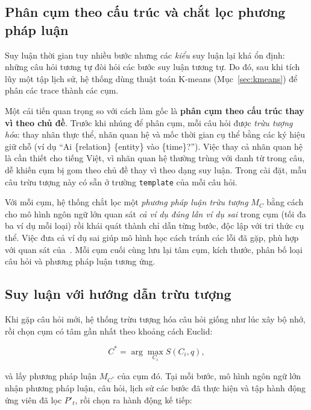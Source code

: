 \subsection{Phân cụm theo cấu trúc và chắt lọc phương pháp luận}
\label{sec:induce}

Suy luận thời gian tuy nhiều bước nhưng các \emph{kiểu} suy luận lại khá ổn định: những câu hỏi
tương tự đòi hỏi các bước suy luận tương tự. Do đó, sau khi tích lũy một tập lịch sử, hệ thống dùng
thuật toán K-means (Mục~\ref{sec:kmeans}) để phân các trace thành các cụm.

Một cải tiến quan trọng so với cách làm gốc là \textbf{phân cụm theo cấu trúc thay vì theo chủ đề}.
Trước khi nhúng để phân cụm, mỗi câu hỏi được \emph{trừu tượng hóa}: thay nhãn thực thể, nhãn quan
hệ và mốc thời gian cụ thể bằng các ký hiệu giữ chỗ (ví dụ ``Ai \{relation\} \{entity\} vào
\{time\}?''). Việc thay cả nhãn quan hệ là cần thiết cho tiếng Việt, vì nhãn quan hệ thường trùng
với danh từ trong câu, dễ khiến cụm bị gom theo chủ đề thay vì theo dạng suy luận. Trong cài đặt,
mẫu câu trừu tượng này có sẵn ở trường \texttt{template} của mỗi câu hỏi.

Với mỗi cụm, hệ thống chắt lọc một \emph{phương pháp luận trừu tượng} $M_C$ bằng cách cho mô hình
ngôn ngữ lớn quan sát \emph{cả ví dụ đúng lẫn ví dụ sai} trong cụm (tối đa ba ví dụ mỗi loại) rồi
khái quát thành chỉ dẫn từng bước, độc lập với tri thức cụ thể. Việc đưa cả ví dụ sai giúp mô hình
học cách tránh các lỗi đã gặp, phù hợp với quan sát của~\cite{chen2024ari}. Mỗi cụm cuối cùng lưu
lại tâm cụm, kích thước, phân bố loại câu hỏi và phương pháp luận tương ứng.

\subsection{Suy luận với hướng dẫn trừu tượng}
\label{sec:inference-loop}

Khi gặp câu hỏi mới, hệ thống trừu tượng hóa câu hỏi giống như lúc xây bộ nhớ, rồi chọn cụm có tâm
gần nhất theo khoảng cách Euclid:

\begin{equation}
\label{eq:select}
C^* = \arg\max_{C_i} S(C_i, q),
\end{equation}

và lấy phương pháp luận $M_{C^*}$ của cụm đó. Tại mỗi bước, mô hình ngôn ngữ lớn nhận phương pháp
luận, câu hỏi, lịch sử các bước đã thực hiện và tập hành động ứng viên đã lọc $P'_t$, rồi chọn ra
hành động kế tiếp:

